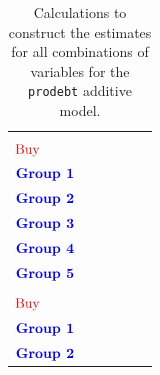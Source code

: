 \documentclass[]{book}
\theoremstyle{definition}
\theoremstyle{definition}
\theoremstyle{remark}
\begin{document}
\begin{longtable}[]{@{}llllll@{}}
\caption{\label{tab:Table4-3} Calculations to construct the estimates for all
combinations of variables for the \texttt{prodebt} additive model.}\tabularnewline
\toprule
\begin{minipage}[b]{0.12\columnwidth}\raggedright\strut
\(\color{red}{\text{Cig}}\)\\
\(\color{red}{\text{Buy}}\)\strut
\end{minipage} & \begin{minipage}[b]{0.12\columnwidth}\raggedright\strut
\(\color{blue}{\textbf{Income}}\)\\
\(\color{blue}{\textbf{Group 1}}\)\strut
\end{minipage} & \begin{minipage}[b]{0.15\columnwidth}\raggedright\strut
\(\color{blue}{\textbf{Income}}\)\\
\(\color{blue}{\textbf{Group 2}}\)\strut
\end{minipage} & \begin{minipage}[b]{0.15\columnwidth}\raggedright\strut
\(\color{blue}{\textbf{Income}}\)\\
\(\color{blue}{\textbf{Group 3}}\)\strut
\end{minipage} & \begin{minipage}[b]{0.15\columnwidth}\raggedright\strut
\(\color{blue}{\textbf{Income}}\)\\
\(\color{blue}{\textbf{Group 4}}\)\strut
\end{minipage} & \begin{minipage}[b]{0.15\columnwidth}\raggedright\strut
\(\color{blue}{\textbf{Income}}\)\\
\(\color{blue}{\textbf{Group 5}}\)\strut
\end{minipage}\tabularnewline
\midrule
\endfirsthead
\toprule
\begin{minipage}[b]{0.12\columnwidth}\raggedright\strut
\(\color{red}{\text{Cig}}\)\\
\(\color{red}{\text{Buy}}\)\strut
\end{minipage} & \begin{minipage}[b]{0.12\columnwidth}\raggedright\strut
\(\color{blue}{\textbf{Income}}\)\\
\(\color{blue}{\textbf{Group 1}}\)\strut
\end{minipage} & \begin{minipage}[b]{0.15\columnwidth}\raggedright\strut
\(\color{blue}{\textbf{Income}}\)\\
\(\color{blue}{\textbf{Group 2}}\)\strut

\end{minipage}
\end{longtable}
\end{document}
